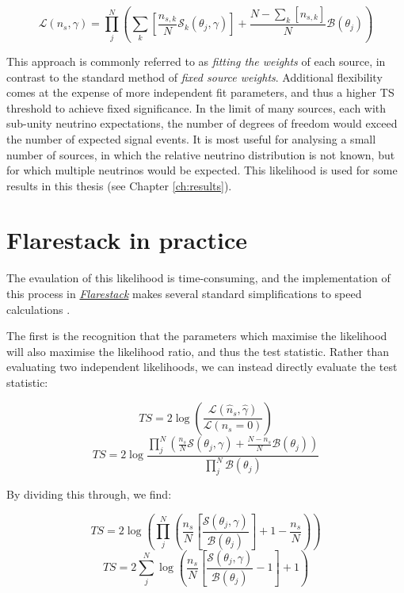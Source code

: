 \begin{equation}
	\mathcal{L}(n_{s}, \gamma) = \prod_{j}^{N} \left(\sum_{k} \left[ \frac{n_{s, k}}{N} \mathcal{S}_{k}(\theta_{j}, \gamma) \right]+ \frac{N - \sum_{k} \left[ n_{s, k} \right] }{N} \mathcal{B}(\theta_{j})  \right)
\end{equation}

This approach is commonly referred to as \emph{fitting the weights} of each source, in contrast to the standard method of \emph{fixed source weights}. Additional flexibility comes at the expense of more independent fit parameters, and thus a higher TS threshold to achieve fixed significance. In the limit of many sources, each with sub-unity neutrino expectations, the number of degrees of freedom would exceed the number of expected signal events. It is most useful for analysing a small number of sources, in which the relative neutrino distribution is not known, but for which multiple neutrinos would be expected. This likelihood is used for some results in this thesis (see Chapter \ref{ch:results}).

\section{Flarestack in practice}
The evaulation of this likelihood is time-consuming, and the implementation of this process in \emph{\href{https://github.com/IceCubeOpenSource/flarestack}{Flarestack}} makes several standard simplifications to speed calculations . 


The first is the recognition that the parameters which maximise the likelihood will also maximise the likelihood ratio, and thus the test statistic. Rather than evaluating two independent likelihoods, we can instead directly evaluate the test statistic:

\begin{equation}
	TS = 2 \log \left( \frac{ \mathcal{L}(\hat{n}_{s}, \hat{\gamma}) }{\mathcal{L}(n_{s} = 0)} \right)
\end{equation}
\begin{equation}
TS = 2 \log  \frac{\prod_{j}^{N} \left(\frac{n_{s}}{N} \mathcal{S}(\theta_{j}, \gamma) + \frac{N - n_{s}}{N} \mathcal{B}(\theta_{j})  \right)}{\prod_{j}^{N}\mathcal{B}(\theta_{j})}
\end{equation}

By dividing this through, we find: 

\begin{equation}
	TS =  2 \log \left(  \prod_{j}^{N} \left(\frac{n_{s}}{N} \left[\frac{\mathcal{S}(\theta_{j}, \gamma)}{\mathcal{B}(\theta_{j})} \right] + 1 - \frac{n_{s}}{N} \right) \right) 
\end{equation}
\begin{equation}
	TS = 2 \sum_{j}^{N} \log \left(\frac{n_{s}}{N} \left[ \frac{\mathcal{S}(\theta_{j}, \gamma)}{\mathcal{B}(\theta_{j}) } - 1 \right] + 1 \right) 
\label{eq:TS_reduced}
\end{equation}

